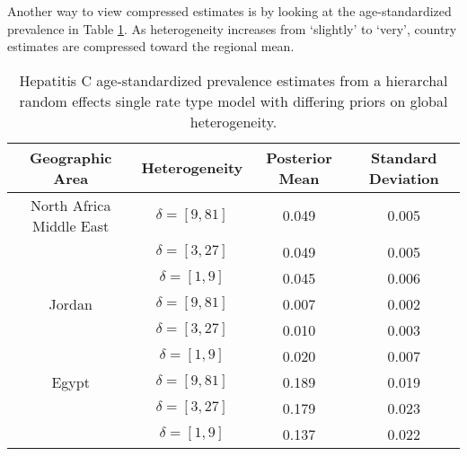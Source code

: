 Another way to view compressed estimates is by looking at the age-standardized prevalence in Table \ref{tab:app-hepc global rfx}.  As heterogeneity increases from `slightly' to `very', country estimates are compressed toward the regional mean.

    \begin{table}[h]
        \begin{center}
        \caption{ Hepatitis C age-standardized prevalence estimates from a hierarchal random effects single rate type model with differing priors on global heterogeneity.}
        \label{tab:app-hepc global rfx}
        \begin{tabular}{|c|c|c|c|}
            \hline
                Geographic Area & Heterogeneity & Posterior Mean & Standard Deviation \\
            \hline
                North Africa Middle East & $\delta = [9,81]$ & 0.049 & 0.005 \\
                & $\delta = [3,27]$ & 0.049 & 0.005 \\
                & $\delta = [1,9]$ & 0.045 & 0.006 \\
            \hline
                Jordan & $\delta = [9,81]$ & 0.007 & 0.002 \\
                & $\delta = [3,27]$ & 0.010 & 0.003 \\
                & $\delta = [1,9]$ & 0.020 & 0.007 \\
            \hline
                Egypt & $\delta = [9,81]$ & 0.189 & 0.019 \\
                & $\delta = [3,27]$ & 0.179 & 0.023 \\
                & $\delta = [1,9]$ & 0.137 & 0.022 \\
            \hline
        \end{tabular}
        \end{center}
    \end{table}
